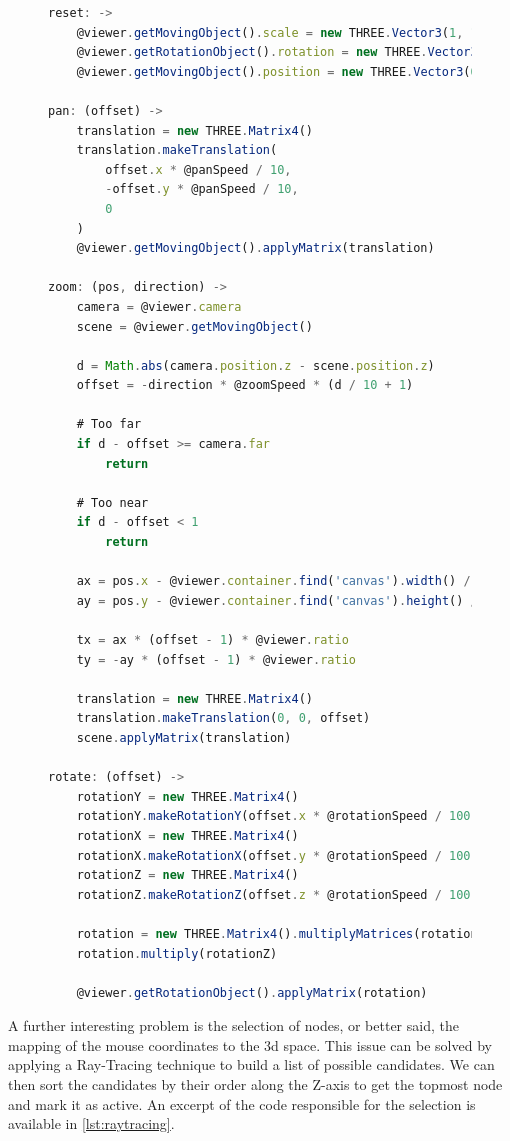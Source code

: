 \begin{figure}
\begin{lstlisting}[caption={Viewport modification functions.},label=lst:viewport,language=javascript]
reset: ->
    @viewer.getMovingObject().scale = new THREE.Vector3(1, 1, 1)
    @viewer.getRotationObject().rotation = new THREE.Vector3(0, 0, 0)
    @viewer.getMovingObject().position = new THREE.Vector3(0, 0, 0)

pan: (offset) ->
    translation = new THREE.Matrix4()
    translation.makeTranslation(
        offset.x * @panSpeed / 10,
        -offset.y * @panSpeed / 10,
        0
    )
    @viewer.getMovingObject().applyMatrix(translation)

zoom: (pos, direction) ->
    camera = @viewer.camera
    scene = @viewer.getMovingObject()

    d = Math.abs(camera.position.z - scene.position.z)
    offset = -direction * @zoomSpeed * (d / 10 + 1)

    # Too far
    if d - offset >= camera.far
        return

    # Too near
    if d - offset < 1
        return

    ax = pos.x - @viewer.container.find('canvas').width() / 2
    ay = pos.y - @viewer.container.find('canvas').height() / 2

    tx = ax * (offset - 1) * @viewer.ratio
    ty = -ay * (offset - 1) * @viewer.ratio

    translation = new THREE.Matrix4()
    translation.makeTranslation(0, 0, offset)
    scene.applyMatrix(translation)

rotate: (offset) ->
    rotationY = new THREE.Matrix4()
    rotationY.makeRotationY(offset.x * @rotationSpeed / 100)
    rotationX = new THREE.Matrix4()
    rotationX.makeRotationX(offset.y * @rotationSpeed / 100)
    rotationZ = new THREE.Matrix4()
    rotationZ.makeRotationZ(offset.z * @rotationSpeed / 100)

    rotation = new THREE.Matrix4().multiplyMatrices(rotationX, rotationY)
    rotation.multiply(rotationZ)

    @viewer.getRotationObject().applyMatrix(rotation)
\end{lstlisting}
\end{figure}

A further interesting problem is the selection of nodes, or better said, the mapping of the mouse coordinates to the \gls{3d} space. This issue can be solved by applying a Ray-Tracing technique to build a list of possible candidates. We can then sort the candidates by their order along the Z-axis to get the topmost node and mark it as active. An excerpt of the code responsible for the selection is available in \vref{lst:raytracing}.

